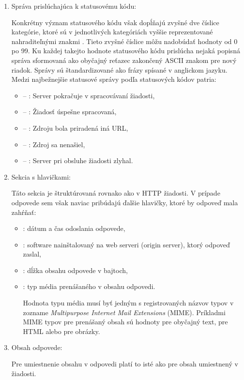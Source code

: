 \begin{enumerate}
    \item Správa prislúchajúca k statusovému kódu:

    Konkrétny význam statusového kódu však dopĺňajú zvyšné dve číslice kategórie, ktoré sú v jednotlivých kategóriách vyššie reprezentované nahraditeľnými znakmi .
    Tieto zvyšné číslice môžu nadobúdať hodnoty od 0 po 99.
    Ku každej takejto hodnote statusového kódu prislúcha nejaká popisná správa sformovaná ako obyčajný reťazec zakončený ASCII znakom pre nový riadok. 
    Správy sú štandardizované ako frázy spísané v anglickom jazyku.
    Medzi najbežnejšie statusové správy podľa statusových kódov patria:

    \begin{itemize}
        \item {} -- : Server pokračuje v spracovávaní žiadosti,
        \item {} -- : Žiadosť úspešne spracovaná,
        \item {} -- : Zdroju bola priradená iná URL,
        \item {} -- : Zdroj sa nenašiel,
        \item {} -- : Server pri obsluhe žiadosti zlyhal.
    \end{itemize}

    \item Sekcia s hlavičkami:

    Táto sekcia je štruktúrovaná rovnako ako v HTTP žiadosti. V prípade odpovede sem však naviac pribúdajú ďalšie hlavičky, ktoré by odpoveď mala zahŕňať: 

    \begin{itemize}
        \item {}: dátum a čas odoslania odpovede,
        \item {}: software nainštalovaný na web serveri (origin server), ktorý odpoveď zaslal,
        \item {}: dĺžka obsahu odpovede v bajtoch,
        \item {}: typ média prenášaného v obsahu odpovedi.

        Hodnota typu média musí byť jedným s registrovaných názvov typov v zozname \textit{Multipurpose Internet Mail Extensions} (MIME). 
        Príkladmi MIME typov pre prenášaný obsah sú hodnoty  pre obyčajný text,  pre HTML alebo  pre obrázky.
    \end{itemize}

    \item Obsah odpovede:

    Pre umiestnenie obsahu v odpovedi platí to isté ako pre obsah umiestnený v žiadosti.
\end{enumerate}

